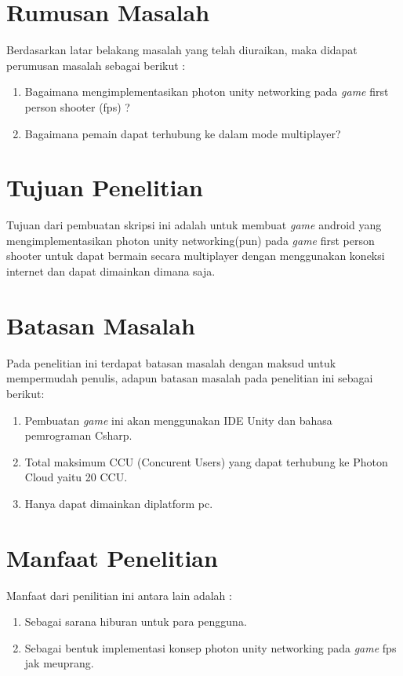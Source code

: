 \section{Rumusan Masalah}
Berdasarkan latar belakang masalah yang telah diuraikan, maka didapat perumusan masalah sebagai berikut :
\begin{enumerate}
	\item Bagaimana mengimplementasikan photon unity networking pada \textit{game} first person shooter (fps) ?
	\item Bagaimana pemain dapat terhubung ke dalam mode multiplayer?
	\end{enumerate}	
\section{Tujuan Penelitian}
Tujuan dari pembuatan skripsi ini adalah untuk membuat \textit{game} android yang mengimplementasikan photon unity networking(pun) pada \textit{game} first person shooter untuk dapat bermain secara multiplayer dengan menggunakan koneksi internet dan dapat dimainkan dimana saja.

\section{Batasan Masalah}
Pada penelitian ini terdapat batasan masalah dengan maksud untuk mempermudah penulis, adapun batasan masalah pada penelitian ini sebagai berikut:
\begin{enumerate}
	\item Pembuatan \textit{game} ini akan menggunakan IDE Unity dan bahasa pemrograman Csharp.
	\item Total maksimum CCU (Concurent Users) yang dapat terhubung ke Photon Cloud yaitu 20 CCU.
	\item Hanya dapat dimainkan diplatform pc.
\end{enumerate}

\section{Manfaat Penelitian}
Manfaat dari penilitian ini antara lain adalah : 
\begin{enumerate}
	\item Sebagai sarana hiburan untuk para pengguna.
	\item Sebagai bentuk implementasi konsep photon unity networking pada \textit{game} fps jak meuprang.
\end{enumerate}